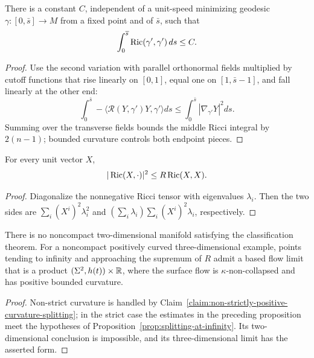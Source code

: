 \begin{claim}\label{claim:ricci-integral-bound}
There is a constant $C$, independent of a unit-speed minimizing
geodesic $\gamma:[0,\bar s]\to M$ from a fixed point and of
$\bar s$, such that
\[
 \int_0^{\overline s}\operatorname{Ric}(\gamma',\gamma')\,ds\leq C.
\]
\end{claim}
\begin{proof}
\sketch Use the second variation with parallel orthonormal fields
multiplied by cutoff functions that rise linearly on $[0,1]$, equal
one on $[1,\bar s-1]$, and fall linearly at the other end:
\begin{equation}\label{Yeqn}
 \int_0^{\bar s}-\langle\mathcal R(Y,\gamma')Y,\gamma'\rangle ds
 \leq\int_0^{\bar s}|\nabla_{\gamma'}Y|^2ds.
\end{equation}
Summing over the transverse fields bounds the middle Ricci integral
by $2(n-1)$; bounded curvature controls both endpoint pieces.
\end{proof}

\begin{claim}\label{claim:ricci-cauchy-schwarz-bound}
For every unit vector $X$,
\[
 |\operatorname{Ric}(X,\cdot)|^2\leq R\operatorname{Ric}(X,X).
\]
\end{claim}
\begin{proof}
\sketch Diagonalize the nonnegative Ricci tensor with eigenvalues
$\lambda_i$. Then the two sides are
$\sum_i(X^i)^2\lambda_i^2$ and
$(\sum_i\lambda_i)\sum_i(X^i)^2\lambda_i$, respectively.
\end{proof}

\begin{corollary}\label{cor:noncompact-soliton-splitting-summary}
\label{compact2Dsol}

There is no noncompact two-dimensional manifold satisfying the
classification theorem. For a noncompact positively curved
three-dimensional example, points tending to infinity and
approaching the supremum of $R$ admit a based flow limit that is a
product $(\Sigma^2,h(t))\times\mathbb{R}$, where the surface flow is
$\kappa$-non-collapsed and has positive bounded curvature.
\end{corollary}
\begin{proof}
\sketch Non-strict curvature is handled by
Claim~\ref{claim:non-strictly-positive-curvature-splitting}; in the
strict case the estimates in the preceding proposition meet the
hypotheses of Proposition~\ref{prop:splitting-at-infinity}. Its
two-dimensional conclusion is impossible, and its
three-dimensional limit has the asserted form.
\end{proof}

